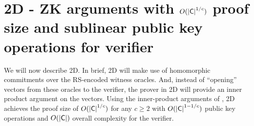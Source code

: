 \section{\name2D{} - ZK arguments with $O(\mathsf{|C|}^{1/c})$ proof size and sublinear public key operations for verifier}
We will now describe \name2D{}. In brief, \name2D{} will make use of homomorphic commitments over the RS-encoded witness oracles.
And, instead of ``opening'' vectors from these oracles to the verifier, the prover in \name2D{} will provide an inner product argument on the vectors.
Using the inner-product arguments of \cite{InnerProductDLS, bulletproofs}, \name2D{} achieves the proof size of $O(\mathsf{|C|}^{1/c})$ for any $c \geq 2$ with $O(\mathsf{|C|}^{1-1/c})$ public key operations and $O(\mathsf{|C|})$ overall complexity for the verifier. 

